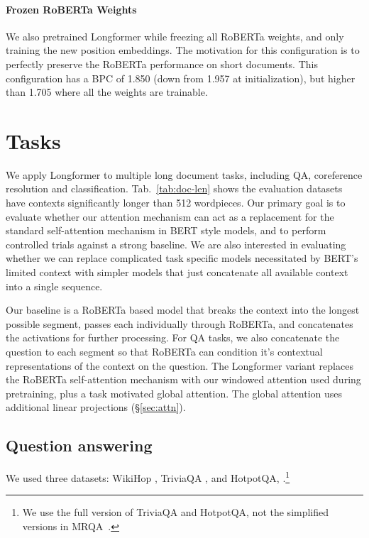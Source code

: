 \documentclass[11pt,a4paper]{article}
\newcommand{\model}{Longformer\xspace}
\begin{document}
\paragraph{Frozen RoBERTa Weights}
We also pretrained \model while freezing all RoBERTa weights, and only training the new position embeddings.  The motivation for this configuration is to perfectly preserve 
the RoBERTa performance on short documents.
This configuration has a BPC of 1.850 (down from 1.957 at initialization), but higher than 1.705 where all the weights 
are trainable.
 
\section{Tasks}

We apply \model to multiple long document tasks, including QA, coreference resolution and classification.  Tab.~\ref{tab:doc-len} shows the evaluation datasets have contexts significantly longer than 512 wordpieces.
Our primary goal is to evaluate whether our attention mechanism can act as a replacement for the standard self-attention mechanism in BERT style models, and to perform controlled trials against a strong baseline.
We are also interested in evaluating whether we can replace complicated task specific models necessitated by BERT's limited context with simpler models that just concatenate all available context into a single sequence.

Our baseline is a RoBERTa based model that breaks the context into the longest possible segment, passes each individually through RoBERTa, and concatenates the activations for further processing.
For QA tasks, we also concatenate the question to each segment so that RoBERTa can condition it's contextual representations of the context on the question.
The \model variant replaces the RoBERTa self-attention mechanism with our windowed attention used during pretraining, plus a task motivated global attention.  The global attention uses additional linear projections (\S\ref{sec:attn}).

\subsection{Question answering}
We used three datasets: WikiHop \cite{Welbl2018ConstructingDF-Wikihop}, TriviaQA \cite[][Wikipedia setting]{Joshi2017TriviaQAAL}, and HotpotQA, \cite[][distractor setting]{Yang2018-HotpotQAAD}.\footnote{We use the full version of TriviaQA and HotpotQA, not the simplified versions in MRQA~\cite{mrqa}.} 
\end{document}
